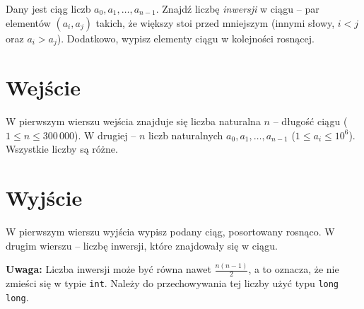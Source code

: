 \documentclass{spiral-kurs}
\begin{document}
\makeheader
%

  Dany jest ciąg liczb $a_0, a_1, \ldots, a_{n-1}$. Znajdź liczbę \emph{inwersji} w ciągu -- par elementów $(a_i, a_j)$ takich, że większy stoi przed mniejszym (innymi słowy, $i < j$ oraz $a_i > a_j$).
  Dodatkowo, wypisz elementy ciągu w kolejności rosnącej.

    \section{Wejście}
    W pierwszym wierszu wejścia znajduje się liczba naturalna $n$ -- długość ciągu ($1 \leq n \leq 300 \, 000$). W drugiej -- $n$ liczb
naturalnych $a_0, a_1, \ldots ,a_{n-1}$ ($1 \leq a_i \leq 10^6$). Wszystkie liczby są różne.

    \section{Wyjście}
    W pierwszym wierszu wyjścia wypisz podany ciąg, posortowany rosnąco. W drugim wierszu -- liczbę inwersji, które znajdowały się w ciągu.

    {\bf Uwaga:} Liczba inwersji może być równa nawet $\frac{n(n-1)}{2}$, a to oznacza, że nie zmieści się w typie {\tt int}. Należy do przechowywania tej liczby
    użyć typu {\tt long long}.

  
\end{document}
